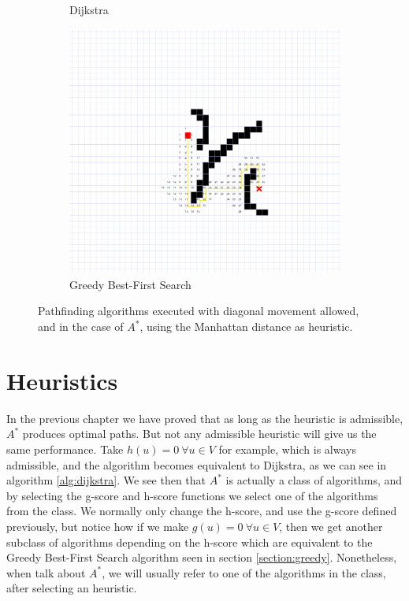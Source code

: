 \documentclass[12pt]{report}
\begin{document}
\begin{figure}
\begin{subfigure}[b]{0.45\textwidth}
	\caption{Dijkstra}
\end{subfigure}
\begin{subfigure}[b]{0.45\textwidth}
	\includegraphics[width=1\linewidth]{greedy-nodes}
	\caption{Greedy Best-First Search}
\end{subfigure}
\caption{Pathfinding algorithms executed with diagonal movement allowed, and in the case of $A^*$, using the Manhattan distance as heuristic.}
\label{fig:node-expansion}
\end{figure}

\chapter{Heuristics}
In the previous chapter we have proved that as long as the heuristic is admissible, $A^*$ produces optimal paths. But not any admissible heuristic will give us the same performance. Take $h(u) = 0 \  \forall u \in V$ for example, which is always admissible, and the algorithm becomes equivalent to Dijkstra, as we can see in algorithm \ref{alg:dijkstra}. We see then that $A^*$ is actually a class of algorithms, and by selecting the g-score and h-score functions we select one of the algorithms from the class. We normally only change the h-score, and use the g-score defined previously, but notice how if we make $g(u) = 0 \  \forall u \in V$, then we get another subclass of algorithms depending on the h-score which are equivalent to the Greedy Best-First Search algorithm seen in section \ref{section:greedy}. Nonetheless, when talk about $A^*$, we will usually refer to one of the algorithms in the class, after selecting an heuristic.
\end{document}
